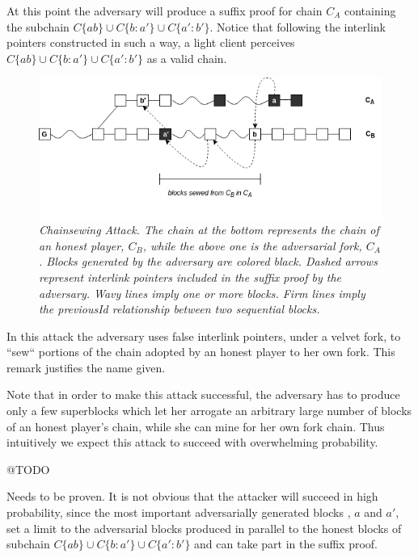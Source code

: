 \documentclass[11pt,a4paper]{article}
\begin{document}
At this point the adversary will produce a suffix proof for chain $C_A$ containing the subchain $C\{ab\} \cup C\{b:a'\} \cup C\{a':b'\}$. Notice that following the interlink pointers constructed in such a way, a light client perceives $C\{ab\} \cup C\{b:a'\} \cup C\{a':b'\}$  as a valid chain.

\begin{figure}[h!]
	\begin{center}
		\includegraphics[scale=0.55]{figures/chainsewing_attack.png}
	\end{center}
	\caption{\textit{Chainsewing Attack. The chain at the bottom represents the chain of an honest player, $C_B$, while the above one is the adversarial fork, $C_A$. Blocks generated by the adversary are colored black. Dashed arrows represent interlink pointers included in the suffix proof by the adversary. Wavy lines imply one or more blocks. Firm lines imply the previousId relationship between two sequential blocks.}}
	\label{fig:attack}
\end{figure}

In this attack the adversary uses false interlink pointers, under a velvet fork,  to ``sew`` portions of the chain adopted by an honest player to her own fork. This remark justifies the name given.  

Note that in order to make this attack successful, the adversary has to produce only a few superblocks which let her arrogate an arbitrary large number of blocks of an honest player's chain, while she can mine for her own fork chain. Thus intuitively we expect this attack to succeed with overwhelming probability.

@TODO

Needs to be proven. It is not obvious that the attacker will succeed in high probability, since the most important adversarially generated blocks , $a$ and $a'$, set a limit to the adversarial blocks produced in parallel to the honest blocks of subchain $C\{ab\} \cup C\{b:a'\} \cup C\{a':b'\}$ and can take part in the suffix proof.
\end{document}
